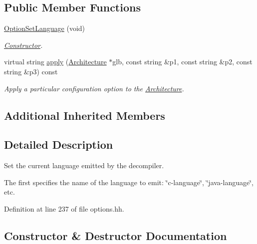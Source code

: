 \subsection*{Public Member Functions}
\begin{DoxyCompactItemize}
\item 
\mbox{\hyperlink{class_option_set_language_a27680fccace5f1ef651121d277250627}{Option\+Set\+Language}} (void)
\begin{DoxyCompactList}\small\item\em \mbox{\hyperlink{class_constructor}{Constructor}}. \end{DoxyCompactList}\item 
virtual string \mbox{\hyperlink{class_option_set_language_add4e5b7ef4cc478556814a4b232969fc}{apply}} (\mbox{\hyperlink{class_architecture}{Architecture}} $\ast$glb, const string \&p1, const string \&p2, const string \&p3) const
\begin{DoxyCompactList}\small\item\em Apply a particular configuration option to the \mbox{\hyperlink{class_architecture}{Architecture}}. \end{DoxyCompactList}\end{DoxyCompactItemize}
\subsection*{Additional Inherited Members}


\subsection{Detailed Description}
Set the current language emitted by the decompiler. 

The first specifies the name of the language to emit\+: \char`\"{}c-\/language\char`\"{}, \char`\"{}java-\/language\char`\"{}, etc. 

Definition at line 237 of file options.\+hh.



\subsection{Constructor \& Destructor Documentation}
\mbox{\label{class_option_set_language_a27680fccace5f1ef651121d277250627}} 
